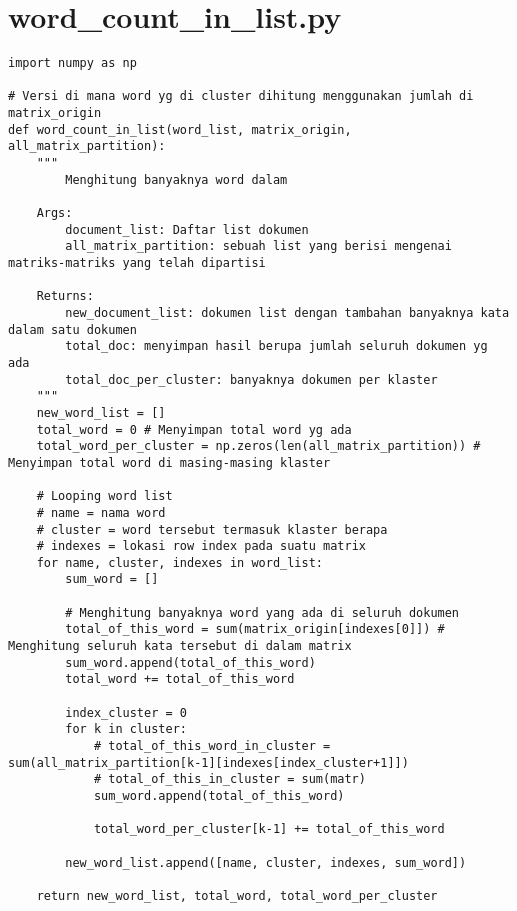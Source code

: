 \chapter{word\_count\_in\_list.py}
\begin{lstlisting}[breaklines=true]
import numpy as np

# Versi di mana word yg di cluster dihitung menggunakan jumlah di matrix_origin
def word_count_in_list(word_list, matrix_origin, all_matrix_partition):
	"""
		Menghitung banyaknya word dalam 

	Args:
		document_list: Daftar list dokumen
		all_matrix_partition: sebuah list yang berisi mengenai matriks-matriks yang telah dipartisi
		
	Returns:
		new_document_list: dokumen list dengan tambahan banyaknya kata dalam satu dokumen
		total_doc: menyimpan hasil berupa jumlah seluruh dokumen yg ada
		total_doc_per_cluster: banyaknya dokumen per klaster 
	"""
	new_word_list = [] 
	total_word = 0 # Menyimpan total word yg ada
	total_word_per_cluster = np.zeros(len(all_matrix_partition)) # Menyimpan total word di masing-masing klaster
	
	# Looping word list
	# name = nama word
	# cluster = word tersebut termasuk klaster berapa
	# indexes = lokasi row index pada suatu matrix
	for name, cluster, indexes in word_list:
		sum_word = []
		
		# Menghitung banyaknya word yang ada di seluruh dokumen
		total_of_this_word = sum(matrix_origin[indexes[0]]) # Menghitung seluruh kata tersebut di dalam matrix
		sum_word.append(total_of_this_word)
		total_word += total_of_this_word
		
		index_cluster = 0
		for k in cluster:
			# total_of_this_word_in_cluster = sum(all_matrix_partition[k-1][indexes[index_cluster+1]])
			# total_of_this_in_cluster = sum(matr)
			sum_word.append(total_of_this_word)
			
			total_word_per_cluster[k-1] += total_of_this_word
			
		new_word_list.append([name, cluster, indexes, sum_word])
		
	return new_word_list, total_word, total_word_per_cluster

\end{lstlisting}

